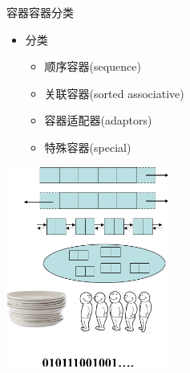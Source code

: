 \begin{frame}[t, fragile]{容器}{容器分类}%
  \begin{itemize}
  \item 分类
    \begin{itemize}
    \item 顺序容器(sequence)
    \item 关联容器(sorted associative)
    \item 容器适配器(adaptors)
    \item 特殊容器(special)
    \end{itemize}
  \end{itemize}
  \begin{center}
    \includegraphics[width=0.4\textwidth]{figure/chap07/04stl0container}
  \end{center}  
\end{frame}


